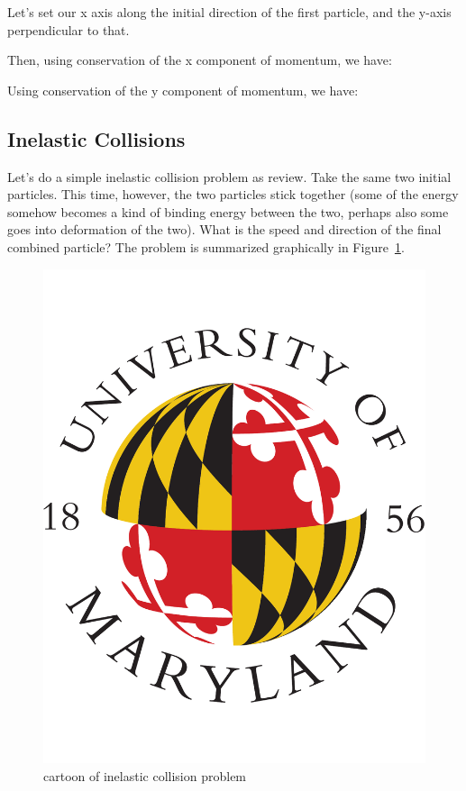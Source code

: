Let's set our x axis along the initial direction of the first particle, and the y-axis perpendicular to that.

Then, using conservation of the x component of momentum, we have:
$$ $$

Using conservation of the y component of momentum, we have:


\subsection{Inelastic Collisions}

Let's do a simple inelastic collision problem as review.  Take the same two initial particles.  This time, however, the two particles stick together (some of the energy somehow becomes a kind of binding energy between the two, perhaps also some goes into deformation of the two).  What is the speed and direction of the final combined particle?  The problem is summarized graphically in Figure~\ref{fig:inelastic}.
 
\begin{figure}[h]
\centering\includegraphics[scale=0.5]{./collisions/Pictures/placeholder.pdf}
\caption{cartoon of inelastic collision problem}
\label{fig:inelastic}
\end{figure}
